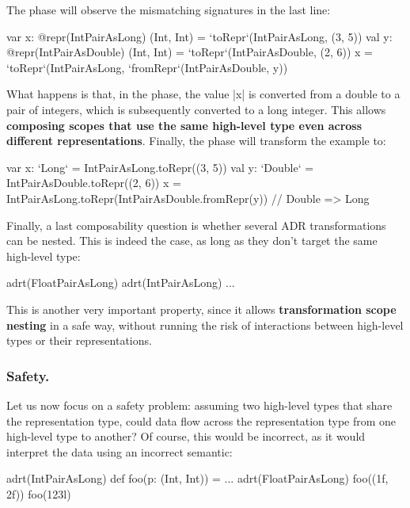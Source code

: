 The \coerce{} phase will observe the mismatching signatures in the last line:

\begin{lstlisting-nobreak}
var x: @repr(IntPairAsLong) (Int, Int) = `toRepr`(IntPairAsLong, (3, 5))
val y: @repr(IntPairAsDouble) (Int, Int) = `toRepr`(IntPairAsDouble, (2, 6))
x = `toRepr`(IntPairAsLong, `fromRepr`(IntPairAsDouble, y))
\end{lstlisting-nobreak}

What happens is that, in the \coerce{} phase, the value |x| is converted from a double to a pair of integers, which is subsequently converted to a long integer. This allows \textbf{composing scopes that use the same high-level type even across different representations}. Finally, the \commit{} phase will transform the example to:

\begin{lstlisting-nobreak}
var x: `Long` = IntPairAsLong.toRepr((3, 5))
val y: `Double` = IntPairAsDouble.toRepr((2, 6))
x = IntPairAsLong.toRepr(IntPairAsDouble.fromRepr(y)) // Double => Long
\end{lstlisting-nobreak}

Finally, a last composability question is whether several ADR transformations can be nested. This is indeed the case, as long as they don't target the same high-level type:

\begin{lstlisting-nobreak}
adrt(FloatPairAsLong) {
  adrt(IntPairAsLong) {
    ...
  }
}
\end{lstlisting-nobreak}

This is another very important property, since it allows \textbf{transformation scope nesting} in a safe way, without running the risk of interactions between high-level types or their representations.

\subsubsection{Safety.} Let us now focus on a safety problem: assuming two high-level types that share the representation type, could data flow across the representation type from one high-level type to another? Of course, this would be incorrect, as it would interpret the data using an incorrect semantic:

\begin{lstlisting-nobreak}
adrt(IntPairAsLong) { def foo(p: (Int, Int)) = ... }
adrt(FloatPairAsLong) { foo((1f, 2f)) }
foo(123l)
\end{lstlisting-nobreak}

